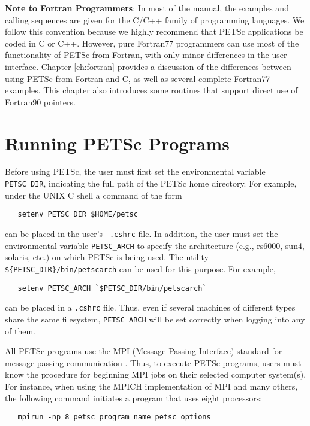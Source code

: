 \medskip \medskip

{\bf Note to Fortran Programmers}: In most of the  
manual, the examples and calling sequences are given for the C/C++
family of programming languages.  We follow this convention because we
highly recommend that PETSc applications be coded in C or C++.
However, pure Fortran77 programmers can use most of the
functionality of PETSc from Fortran, with only minor differences in
the user interface.  Chapter \ref{ch:fortran} provides a discussion of the
differences between using PETSc from Fortran and C, as well as several
complete Fortran77 examples.  This chapter also introduces some
routines that support direct use of Fortran90 pointers.

\section{Running PETSc Programs}
\label{sec:running}

Before using PETSc, the user must first set the environmental variable
{\tt PETSC\_DIR},  indicating the full path of the PETSc home
directory.  For example, under the UNIX C shell a command of the form
\begin{verbatim}
   setenv PETSC_DIR $HOME/petsc
\end{verbatim}
 can be placed in the user's {\tt
.cshrc} file.  In addition, the user must set the environmental
variable {\tt PETSC\_ARCH} to specify the architecture (e.g., rs6000,
sun4, solaris, etc.)  on which PETSc is being used.  The utility {\tt
\$\{PETSC\_DIR\}/bin/petscarch} can be used for this purpose.  For example,
\begin{verbatim}
   setenv PETSC_ARCH `$PETSC_DIR/bin/petscarch`
\end{verbatim}
can be placed in a {\tt .cshrc} file.  Thus, even if several machines of different
types share the same filesystem, {\tt PETSC\_ARCH} will be set correctly
when logging into any of them. 

All PETSc programs use the MPI (Message Passing Interface) standard
for message-passing communication \cite{MPI-final}.  Thus, to execute
PETSc programs, users must know the procedure for beginning MPI jobs
on their selected computer system(s).  For instance, when using the
MPICH implementation of MPI \cite{mpich-web-page} and many others, the following
command initiates a program that uses eight processors:
  
\begin{verbatim}
   mpirun -np 8 petsc_program_name petsc_options
\end{verbatim}


